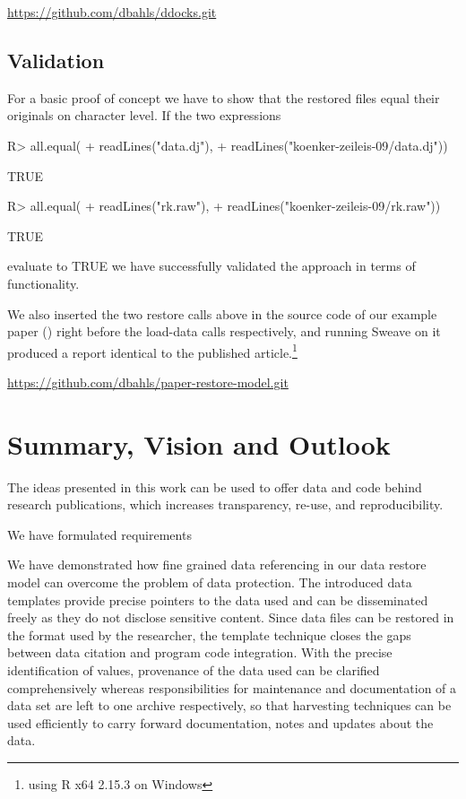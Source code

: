 \documentclass{acm_proc_article-sp}
\begin{document}
\url{https://github.com/dbahls/ddocks.git}

\subsection{Validation}

For a basic proof of concept we have to show that the restored files equal their originals on character level.
If the two expressions
\begin{Schunk}
\begin{Sinput}
R> all.equal(
+    readLines("data.dj"), 
+    readLines("koenker-zeileis-09/data.dj")) 
\end{Sinput}
\begin{Soutput}
[1] TRUE
\end{Soutput}
\begin{Sinput}
R> all.equal(
+    readLines("rk.raw"), 
+    readLines("koenker-zeileis-09/rk.raw")) 
\end{Sinput}
\begin{Soutput}
[1] TRUE
\end{Soutput}
\end{Schunk}
evaluate to TRUE we have successfully validated the approach in terms of functionality.

We also inserted the two restore calls above in the source code of our example paper (\cite{koenkerzeileis09}) right before the load-data calls respectively, and running Sweave on it produced a report identical to the published article.\footnote{using R x64 2.15.3 on Windows}
%
%

\url{https://github.com/dbahls/paper-restore-model.git}


\section{Summary, Vision and Outlook}


The ideas presented in this work can be used to offer data and code behind research publications, which increases transparency, re-use, and reproducibility.

We have formulated requirements

We have demonstrated how fine grained data referencing in our data restore model can overcome the problem of data protection.
The introduced data templates provide precise pointers to the data used and can be disseminated freely as they do not disclose sensitive content.
Since data files can be restored in the format used by the researcher, the template technique closes the gaps between data citation and program code integration.
With the precise identification of values, provenance of the data used can be clarified comprehensively whereas responsibilities for maintenance and documentation of a data set are left to one archive respectively, so that harvesting techniques can be used efficiently to carry forward documentation, notes and updates about the data.
\end{document}

